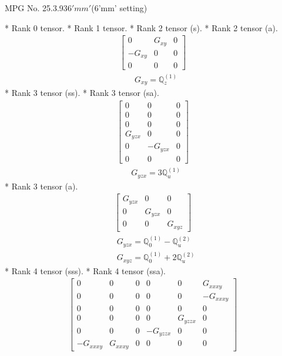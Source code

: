 \documentclass[fleqn,8pt,landscape]{jsarticle}
\begin{document}
\setcounter{MaxMatrixCols}{32}

\renewcommand{\tablename}{Table~}
\renewcommand{\figurename}{Figure~}
\begin{center}
\LARGE
MPG No. 25.3.93\quad$6'mm'$\quad(6'mm' setting)
\end{center}
* Rank 0 tensor.
* Rank 1 tensor.
* Rank 2 tensor (s).
* Rank 2 tensor (a).
\begin{align*}
\begin{bmatrix} 0 & G_{xy} & 0 \\ - G_{xy} & 0 & 0 \\ 0 & 0 & 0 \end{bmatrix}
\end{align*}
\begin{align*}
& G_{xy} = \mathbb{Q}_{z}^{(1)}
\end{align*}
* Rank 3 tensor (ss).
* Rank 3 tensor (sa).
\begin{align*}
\begin{bmatrix} 0 & 0 & 0 \\ 0 & 0 & 0 \\ 0 & 0 & 0 \\ G_{yzx} & 0 & 0 \\ 0 & - G_{yzx} & 0 \\ 0 & 0 & 0 \end{bmatrix}
\end{align*}
\begin{align*}
& G_{yzx} = 3 \mathbb{Q}_{u}^{(1)}
\end{align*}
* Rank 3 tensor (a).
\begin{align*}
\begin{bmatrix} G_{yzx} & 0 & 0 \\ 0 & G_{yzx} & 0 \\ 0 & 0 & G_{xyz} \end{bmatrix}
\end{align*}
\begin{align*}
& G_{yzx} = \mathbb{Q}_{0}^{(1)} - \mathbb{Q}_{u}^{(2)} \\
& G_{xyz} = \mathbb{Q}_{0}^{(1)} + 2 \mathbb{Q}_{u}^{(2)}
\end{align*}
* Rank 4 tensor (sss).
* Rank 4 tensor (ssa).
\begin{align*}
\begin{bmatrix} 0 & 0 & 0 & 0 & 0 & G_{xxxy} \\ 0 & 0 & 0 & 0 & 0 & - G_{xxxy} \\ 0 & 0 & 0 & 0 & 0 & 0 \\ 0 & 0 & 0 & 0 & G_{yzzx} & 0 \\ 0 & 0 & 0 & - G_{yzzx} & 0 & 0 \\ - G_{xxxy} & G_{xxxy} & 0 & 0 & 0 & 0 \end{bmatrix}
\end{align*}
\end{document}
